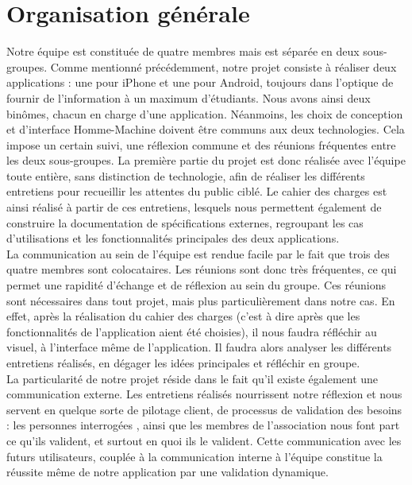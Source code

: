 \documentclass[a4paper,11pt]{article}
\begin{document}
\section{\bf{Organisation générale}}
\indent Notre équipe est constituée de quatre membres mais est séparée en deux sous-groupes. Comme mentionné précédemment, notre projet consiste à réaliser deux applications : une pour iPhone et une pour Android, toujours dans l'optique de fournir de l'information à un maximum d'étudiants. Nous avons ainsi deux binômes, chacun en charge d'une application. Néanmoins, les choix de conception et d'interface Homme-Machine doivent être communs aux deux technologies. Cela impose un certain suivi, une réflexion commune et des réunions fréquentes entre les deux sous-groupes. La première partie du projet est donc réalisée avec l'équipe toute entière, sans distinction de technologie, afin de réaliser les différents entretiens pour recueillir les attentes du public ciblé. Le cahier des charges est ainsi réalisé à partir de ces entretiens, lesquels nous permettent également de construire la documentation de spécifications externes, regroupant les cas d'utilisations et les fonctionnalités principales des deux applications.\\
\indent La communication au sein de l'équipe est rendue facile par le fait que trois des quatre membres sont colocataires. Les réunions sont donc très fréquentes, ce qui permet une rapidité d'échange et de réflexion au sein du groupe. Ces réunions sont nécessaires dans tout projet, mais plus particulièrement dans notre cas. En effet, après la réalisation du cahier des charges (c'est à dire après que les fonctionnalités de l'application aient été choisies), il nous faudra réfléchir au visuel, à l'interface même de l'application. Il faudra alors analyser les différents entretiens réalisés, en dégager les idées principales et réfléchir en groupe.\\
\indent La particularité de notre projet réside dans le fait qu'il existe également une communication externe. Les entretiens réalisés nourrissent notre réflexion et nous servent en quelque sorte de pilotage client, de processus de validation des besoins : les personnes interrogées , ainsi que les membres de l'association nous font part ce qu'ils valident, et surtout en quoi ils le valident. Cette communication avec les futurs utilisateurs, couplée à la communication interne à l'équipe constitue la réussite même de notre application par une validation dynamique.\\
\\
\end{document}

